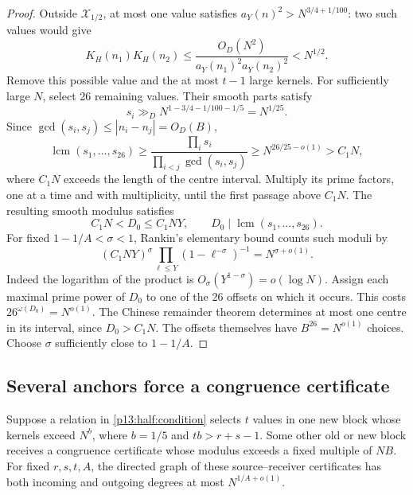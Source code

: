 \begin{proof}
Outside \(\mathcal X_{1/2}\), at most one value satisfies
\(a_Y(n)^2>N^{3/4+1/100}\): two such values would give
\[
 K_H(n_1)K_H(n_2)
 \le\frac{O_D(N^2)}{a_Y(n_1)^2a_Y(n_2)^2}<N^{1/2}.
\]
Remove this possible value and the at most \(t-1\)
large kernels. For sufficiently large \(N\), select
26 remaining values. Their smooth parts satisfy
\[
 s_i\gg_D N^{1-3/4-1/100-1/5}=N^{1/25}.
\]
Since \(\gcd(s_i,s_j)\le |n_i-n_j|=O_D(B)\),
\[
 \operatorname{lcm}(s_1,\ldots,s_{26})
 \ge\frac{\prod_i s_i}{\prod_{i<j}\gcd(s_i,s_j)}
 \ge N^{26/25-o(1)}>C_1N,
\]
where \(C_1N\) exceeds the length of the centre interval.
Multiply its prime factors, one at a time and with
multiplicity, until the first passage above \(C_1N\).
The resulting smooth modulus satisfies
\[
 C_1N<D_0\le C_1NY,\qquad
 D_0\mid\operatorname{lcm}(s_1,\ldots,s_{26}).
\]
For fixed \(1-1/A<\sigma<1\), Rankin's elementary bound
counts such moduli by
\[
 (C_1NY)^\sigma
       \prod_{\ell\le Y}(1-\ell^{-\sigma})^{-1}
 =N^{\sigma+o(1)}.
\]
Indeed the logarithm of the product is
\(O_\sigma(Y^{1-\sigma})=o(\log N)\).
Assign each maximal prime power of \(D_0\) to one of the
26 offsets on which it occurs. This costs
\(26^{\omega(D_0)}=N^{o(1)}\).
The Chinese remainder theorem determines at most one centre
in its interval, since \(D_0>C_1N\). The offsets themselves
have \(B^{26}=N^{o(1)}\) choices.
Choose \(\sigma\) sufficiently close to \(1-1/A\).
\end{proof}

\subsection{Several anchors force a congruence certificate}

\begin{lemma}
\label{p13:half:saturation}
Suppose a relation in \eqref{p13:half:condition} selects
\(t\) values in one new block whose kernels exceed \(N^b\),
where \(b=1/5\) and \(tb>r+s-1\).
Some other old or new block receives a congruence certificate
whose modulus exceeds a fixed multiple of \(NB\).
For fixed \(r,s,t,A\), the directed graph of these
source--receiver certificates has both incoming and outgoing
degrees at most \(N^{1/A+o(1)}\).
\end{lemma}

